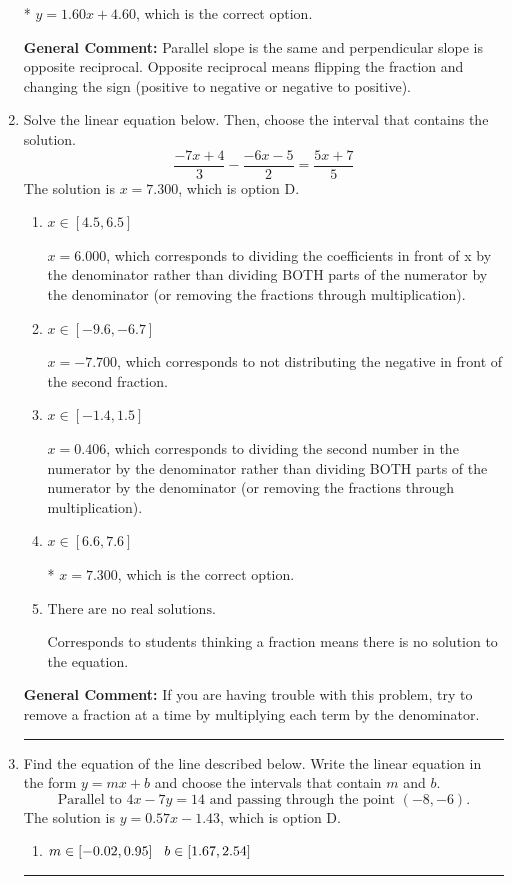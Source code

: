 \documentclass{extbook}[14pt]
\newcommand{\litem}[1]{\item #1

\rule{\textwidth}{0.4pt}}
\begin{document}
\begin{enumerate}
{\begin{enumerate}[label=\Alph*.]
* $y = 1.60x + 4.60$, which is the correct option.
\end{enumerate}

\textbf{General Comment:} Parallel slope is the same and perpendicular slope is opposite reciprocal. Opposite reciprocal means flipping the fraction and changing the sign (positive to negative or negative to positive).
}
\litem{
Solve the linear equation below. Then, choose the interval that contains the solution.
\[ \frac{-7x + 4}{3} - \frac{-6x -5}{2} = \frac{5x + 7}{5} \]The solution is \( x = 7.300 \), which is option D.\begin{enumerate}[label=\Alph*.]
\item \( x \in [4.5, 6.5] \)

 $x = 6.000$, which corresponds to dividing the coefficients in front of x by the denominator rather than dividing BOTH parts of the numerator by the denominator (or removing the fractions through multiplication).
\item \( x \in [-9.6, -6.7] \)

 $x = -7.700$, which corresponds to not distributing the negative in front of the second fraction.
\item \( x \in [-1.4, 1.5] \)

 $x = 0.406$, which corresponds to dividing the second number in the numerator by the denominator rather than dividing BOTH parts of the numerator by the denominator (or removing the fractions through multiplication).
\item \( x \in [6.6, 7.6] \)

* $x = 7.300$, which is the correct option.
\item \( \text{There are no real solutions.} \)

Corresponds to students thinking a fraction means there is no solution to the equation.
\end{enumerate}

\textbf{General Comment:} If you are having trouble with this problem, try to remove a fraction at a time by multiplying each term by the denominator.
}
\litem{
Find the equation of the line described below. Write the linear equation in the form $ y=mx+b $ and choose the intervals that contain $m$ and $b$.
\[ \text{Parallel to } 4 x - 7 y = 14 \text{ and passing through the point } (-8, -6). \]The solution is \( y = 0.57x - 1.43 \), which is option D.\begin{enumerate}[label=\Alph*.]
\item \( m \in [-0.02, 0.95] \hspace*{3mm} b \in [1.67, 2.54] \)


\end{enumerate}}
\end{enumerate}
\end{document}
